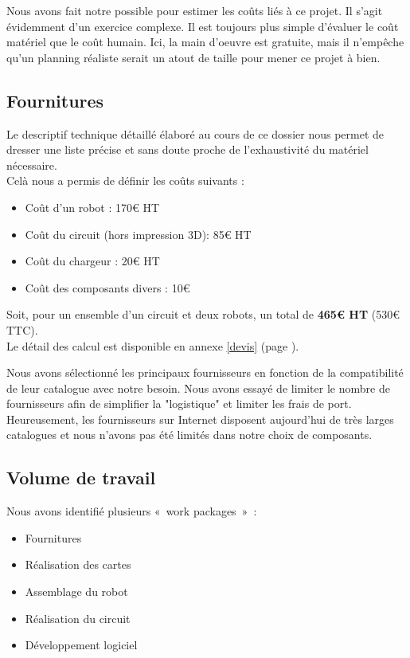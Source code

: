  Nous avons fait notre possible pour estimer les coûts liés à ce projet. Il s'agit évidemment d'un exercice complexe.
 Il est toujours plus simple d'évaluer le coût matériel que le coût humain. Ici, la main d'oeuvre est gratuite, mais il n'empêche qu'un planning réaliste serait un atout de taille pour mener ce projet à bien.

 \subsection{Fournitures}

 	Le descriptif technique détaillé élaboré au cours de ce dossier nous permet de dresser une liste précise et sans doute proche de l'exhaustivité du matériel nécessaire.\\

 	Celà nous a permis de définir les coûts suivants :
 	\begin{itemize}
 		\item Coût d'un robot : 170€ HT
 		\item Coût du circuit (hors impression 3D): 85€ HT
 		\item Coût du chargeur : 20€ HT
 		\item Coût des composants divers : 10€
 	\end{itemize}

 	\vspace{15pt}

 	Soit, pour un ensemble d'un circuit et deux robots, un total de \textbf{465€ HT} (530€ TTC).\\

 	Le détail des calcul est disponible en annexe \ref{devis} (page \pageref{devis}).

 	Nous avons sélectionné les principaux fournisseurs en fonction de la compatibilité de leur catalogue avec notre besoin.
 	Nous avons essayé de limiter le nombre de fournisseurs afin de simplifier la "logistique" et limiter les frais de port.\\

 	Heureusement, les fournisseurs sur Internet disposent aujourd'hui de très larges catalogues et nous n'avons pas été limités dans notre choix de composants.

 \subsection{Volume de travail}

 	Nous avons identifié plusieurs « work packages » :\\
 	\begin{itemize}
 		\item Fournitures
 		\item Réalisation des cartes
 		\item Assemblage du robot
 		\item Réalisation du circuit
 		\item Développement logiciel
 	\end{itemize}

